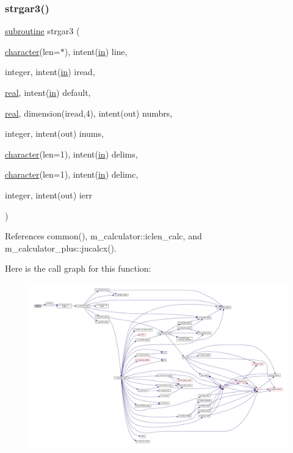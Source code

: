 \mbox{\label{strgar3_8f90_a0934cb639dc2db3450626e1515726e8c}} 
\subsubsection{\texorpdfstring{strgar3()}{strgar3()}}
{\footnotesize\ttfamily \hyperlink{M__stopwatch_83_8txt_acfbcff50169d691ff02d4a123ed70482}{subroutine} strgar3 (\begin{DoxyParamCaption}\item[{\hyperlink{option__stopwatch_83_8txt_abd4b21fbbd175834027b5224bfe97e66}{character}(len=$\ast$), intent(\hyperlink{M__journal_83_8txt_afce72651d1eed785a2132bee863b2f38}{in})}]{line,  }\item[{integer, intent(\hyperlink{M__journal_83_8txt_afce72651d1eed785a2132bee863b2f38}{in})}]{iread,  }\item[{\hyperlink{read__watch_83_8txt_abdb62bde002f38ef75f810d3a905a823}{real}, intent(\hyperlink{M__journal_83_8txt_afce72651d1eed785a2132bee863b2f38}{in})}]{default,  }\item[{\hyperlink{read__watch_83_8txt_abdb62bde002f38ef75f810d3a905a823}{real}, dimension(iread,4), intent(out)}]{numbrs,  }\item[{integer, intent(out)}]{inums,  }\item[{\hyperlink{option__stopwatch_83_8txt_abd4b21fbbd175834027b5224bfe97e66}{character}(len=1), intent(\hyperlink{M__journal_83_8txt_afce72651d1eed785a2132bee863b2f38}{in})}]{delims,  }\item[{\hyperlink{option__stopwatch_83_8txt_abd4b21fbbd175834027b5224bfe97e66}{character}(len=1), intent(\hyperlink{M__journal_83_8txt_afce72651d1eed785a2132bee863b2f38}{in})}]{delimc,  }\item[{integer, intent(out)}]{ierr }\end{DoxyParamCaption})}



References common(), m\+\_\+calculator\+::iclen\+\_\+calc, and m\+\_\+calculator\+\_\+plus\+::jucalcx().

Here is the call graph for this function\+:
\nopagebreak
\begin{figure}[H]
\begin{center}
\leavevmode
\includegraphics[width=350pt]{strgar3_8f90_a0934cb639dc2db3450626e1515726e8c_cgraph}
\end{center}
\end{figure}
